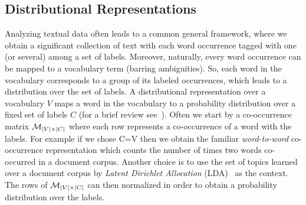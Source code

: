 \subsection{Distributional Representations}
\label{sec:distributional-representations}
Analyzing textual data often leads to a common general framework,
where we obtain a significant collection of text with each word
occurrence tagged with one (or several) among a set of
labels. Moreover, naturally, every word occurrence can be mapped to a
vocabulary term (barring ambiguities). So, each word in the vocabulary
corresponds to a group of its labeled occurrences, which leads to a
distribution over the set of labels. A distributional representation
over a vocabulary $V$ maps a word in the vocabulary to a  
probability distribution over a fixed set of labels $C$  (for a brief review
see~\cite{Turian10wordrepresentations}). Often we start by a
co-occurrence matrix ${\mathcal M}_{|V|\times|C|}$ where each row represents a
co-occurrence of a word with the labels.
For example if we chose C=V then we obtain the familiar {\sl
  word-to-word} co-occurrence representation which counts the number 
of times two words co-occurred in a document corpus. Another choice is
to use the set of topics learned over a document 
corpus by {\sl Latent Dirichlet Allocation}
(LDA)~\cite{Blei:2003:LDA:944919.944937} as the context. The rows of
${\mathcal M}_{|V|\times|C|}$ 
can then normalized in order to obtain a probability distribution over
the labels.



